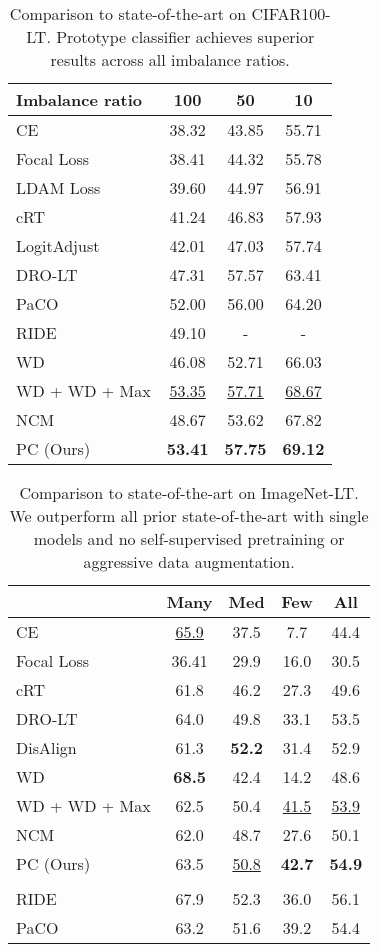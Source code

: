 \documentclass{article}
\begin{document}
\begin{table}[h!]
    \centering
    \begin{tabular}{l c c c}
    \toprule
    Imbalance ratio & 100 & 50 & 10 \\
    \midrule
    CE & 38.32 & 43.85 & 55.71 \\
    Focal Loss & 38.41 & 44.32 & 55.78 \\
    LDAM Loss & 39.60 & 44.97 & 56.91 \\
    cRT & 41.24 & 46.83 & 57.93 \\
    LogitAdjust & 42.01 & 47.03 & 57.74 \\
    DRO-LT & 47.31 & 57.57 & 63.41 \\
    PaCO & 52.00 & 56.00 & 64.20 \\
    RIDE & 49.10 & - & - \\
    WD & 46.08 & 52.71 & 66.03 \\
    WD + WD + Max & \underline{53.35} & \underline{57.71} & \underline{68.67} \\
    \midrule
    NCM & 48.67 & 53.62 & 67.82 \\
    PC (Ours) & \textbf{53.41} & \textbf{57.75} & \textbf{69.12} \\
    \bottomrule
    \end{tabular}
    \caption{Comparison to state-of-the-art on CIFAR100-LT. Prototype classifier achieves superior results across all imbalance ratios.}
    \label{tab:table 4}
\end{table}

\begin{table}[h!]
  \centering
  \begin{tabular}{l c c c c}
    \toprule
      & Many & Med & Few & All \\
    \midrule
    CE & \underline{65.9} & 37.5 & 7.7 & 44.4 \\
    Focal Loss  & 36.41 & 29.9 & 16.0 & 30.5 \\
    cRT  & 61.8 & 46.2 & 27.3 & 49.6 \\
    DRO-LT  & 64.0 & 49.8 & 33.1 & 53.5 \\
    DisAlign & 61.3 & \textbf{52.2} & 31.4 & 52.9 \\
    WD & \textbf{68.5} & 42.4 & 14.2 & 48.6 \\
    WD + WD + Max  & 62.5 & 50.4 & \underline{41.5} & \underline{53.9} \\
    \midrule
    NCM & 62.0 & 48.7 & 27.6 & 50.1 \\
    PC (Ours) & 63.5 & \underline{50.8} & \textbf{42.7} & \textbf{54.9} \\
    \midrule
    \rowcolor{lightgray} \multicolumn{5}{c}{SOTA with ``bells and whistles"} \\
    RIDE & 67.9 & 52.3 & 36.0 & 56.1 \\
    PaCO & 63.2 & 51.6 & 39.2 & 54.4 \\
    \bottomrule
  \end{tabular}
    \caption{Comparison to state-of-the-art on ImageNet-LT. We outperform all prior state-of-the-art with single models and no self-supervised pretraining or aggressive data augmentation.}
    \label{tab:table 5}
\end{table}
\end{document}

